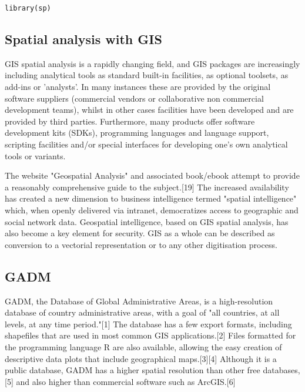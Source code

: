\documentclass[12pt]{article}
\begin{document}
\begin{framed}
\begin{verbatim}
library(sp)
\end{verbatim}
\end{framed}
\subsection*{Spatial analysis with GIS}

GIS spatial analysis is a rapidly changing field, and GIS packages are increasingly including analytical tools as standard built-in facilities, as optional toolsets, as add-ins or 'analysts'. In many instances these are provided by the original software suppliers (commercial vendors or collaborative non commercial development teams), whilst in other cases facilities have been developed and are provided by third parties. Furthermore, many products offer software development kits (SDKs), programming languages and language support, scripting facilities and/or special interfaces for developing one's own analytical tools or variants. 


The website "Geospatial Analysis" and associated book/ebook attempt to provide a reasonably comprehensive guide to the subject.[19] The increased availability has created a new dimension to business intelligence termed "spatial intelligence" which, when openly delivered via intranet, democratizes access to geographic and social network data. Geospatial intelligence, based on GIS spatial analysis, has also become a key element for security. GIS as a whole can be described as conversion to a vectorial representation or to any other digitisation process.
\subsection{GADM}
GADM, the Database of Global Administrative Areas, is a high-resolution database of country administrative areas, with a goal of "all countries, at all levels, at any time period."[1] The database has a few export formats, including shapefiles that are used in most common GIS applications.[2] Files formatted for the programming language R are also available, allowing the easy creation of descriptive data plots that include geographical maps.[3][4]
Although it is a public database, GADM has a higher spatial resolution than other free databases,[5] and also higher than commercial software such as ArcGIS.[6]
\end{document}
